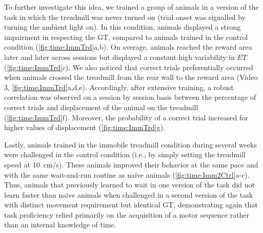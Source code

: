 To further investigate this idea, we trained a group of animals in a version of the task in which the treadmill was never turned on (trial onset was signalled by turning the ambient light on).
In this condition, animals displayed a strong impairment in respecting the GT, compared to animals trained in the control condition (\autoref{fig:time:ImmTrd}a,b).
On average, animals reached the reward area later and later across sessions but displayed a constant high variability in $ET$ (\autoref{fig:time:ImmTrd}c).
We also noticed that correct trials preferentially occurred when animals crossed the treadmill from the rear wall to the reward area (Video 3, \autoref{fig:time:ImmTrd}a,d,e).
Accordingly, after extensive training, a robust correlation was observed on a session by session basis between the percentage of correct trials and displacement of the animal on the treadmill (\autoref{fig:time:ImmTrd}f).
Moreover, the probability of a correct trial increased for higher values of displacement (\autoref{fig:time:ImmTrd}g).
\par

Lastly, animals trained in the immobile treadmill condition during several weeks were challenged in the control condition (i.e., by simply setting the treadmill speed at 10~cm/s).
These animals improved their behavior at the same pace and with the same wait-and-run routine as na\"ive animals (\autoref{fig:time:Imm2Ctrl}a-c).
Thus, animals that previously learned to wait in one version of the task did not learn faster than na\"ive animals when challenged in a second version of the task with distinct movement requirement but identical GT, demonstrating again that task proficiency relied primarily on the acquisition of a motor sequence rather than an internal knowledge of time.